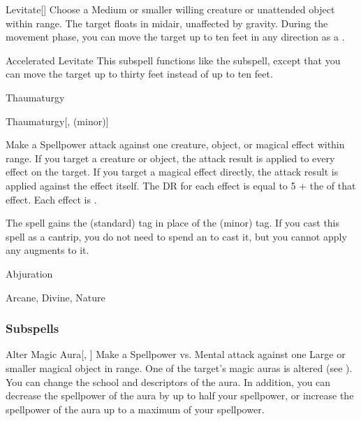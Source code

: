 \begin{ability}[\nth{3}]{Levitate}[]
Choose a Medium or smaller willing creature or unattended object within \rngclose range.
The target floats in midair, unaffected by gravity.
During the movement phase, you can move the target up to ten feet in any direction as a .
\end{ability}
\vspace{0.25em}


\begin{ability}[\nth{5}]{Accelerated Levitate}
This subspell functions like the  subspell, except that you can move the target up to thirty feet instead of up to ten feet.
\end{ability}
\vspace{0.25em}

\newpage
\begin{spellsection}{Thaumaturgy}


\begin{ability}{Thaumaturgy}[,  (minor)]

Make a Spellpower attack against one creature, object, or magical effect within \rngmed range.
If you target a creature or object, the attack result is applied to every  effect on the target.
If you target a magical effect directly, the attack result is applied against the effect itself.
The DR for each effect is equal to 5 + the  of that effect.
\hit Each effect is .

\end{ability}



 The spell gains the  (standard) tag in place of the  (minor) tag. If you cast this spell as a cantrip,
you do not need to spend an  to cast it,
but you cannot apply any augments to it.


 Abjuration

 Arcane, Divine, Nature
\end{spellsection}


\subsubsection{Subspells}


\begin{ability}[\nth{2}]{Alter Magic Aura}[, ]
Make a Spellpower vs. Mental attack against one Large or smaller magical object in \rngmed range.
\hit One of the target's magic auras is altered (see ).
You can change the school and descriptors of the aura.
In addition, you can decrease the spellpower of the aura by up to half your spellpower, or increase the spellpower of the aura up to a maximum of your spellpower.
\end{ability}
\vspace{0.25em}



